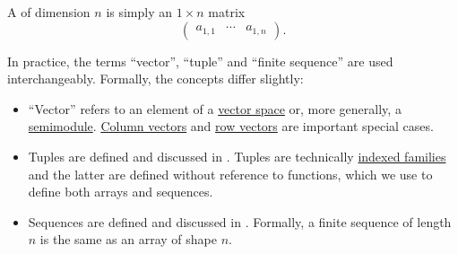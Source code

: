 \begin{definition}
\begin{thmenum}
     A  of dimension \( n \) is simply an \( 1 \times n \) matrix
    \begin{equation*}
      \begin{pmatrix}
        a_{1,1} & \cdots & a_{1,n}
      \end{pmatrix}.
    \end{equation*}
  \end{thmenum}
\end{definition}

\begin{remark}\label{rem:vector_etymology}
  In practice, the terms \enquote{vector}, \enquote{tuple} and \enquote{finite sequence} are used interchangeably. Formally, the concepts differ slightly:

  \begin{itemize}
    \item \enquote{Vector} refers to an element of a \hyperref[def:vector_space]{vector space} or, more generally, a \hyperref[def:semimodule]{semimodule}. \hyperref[def:array/column_vector]{Column vectors} and \hyperref[def:array/row_vector]{row vectors} are important special cases.

    \item Tuples are defined and discussed in . Tuples are technically \hyperref[def:cartesian_product/indexed_family]{indexed families} and the latter are defined without reference to functions, which we use to define both arrays and sequences.

    \item Sequences are defined and discussed in . Formally, a finite sequence of length \( n \) is the same as an array of shape \( n \).
  \end{itemize}
\end{remark}

